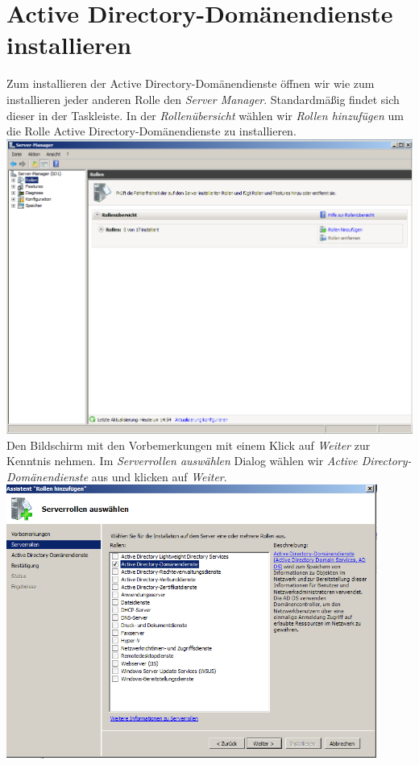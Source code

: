 \documentclass[12pt,a4paper,titlepage]{scrartcl} %
\begin{document}
\newpage
\section{Active Directory-Domänendienste installieren}
Zum installieren der Active Directory-Domänendienste öffnen wir wie zum installieren jeder anderen Rolle den \emph{Server Manager}. Standardmäßig findet sich dieser in der Taskleiste. In der \emph{Rollenübersicht} wählen wir \emph{Rollen hinzufügen} um die Rolle Active Directory-Domänendienste zu installieren.\\

	\includegraphics[width=14cm]{Bilder/006}\\
	
Den Bildschirm mit den Vorbemerkungen mit einem Klick auf \emph{Weiter} zur Kenntnis nehmen. Im \emph{Serverrollen auswählen} Dialog wählen wir \emph{Active Directory-Domänendienste} aus und klicken auf \emph{Weiter}.\\

	\includegraphics[height=9cm]{Bilder/008}\\
	
\end{document}
